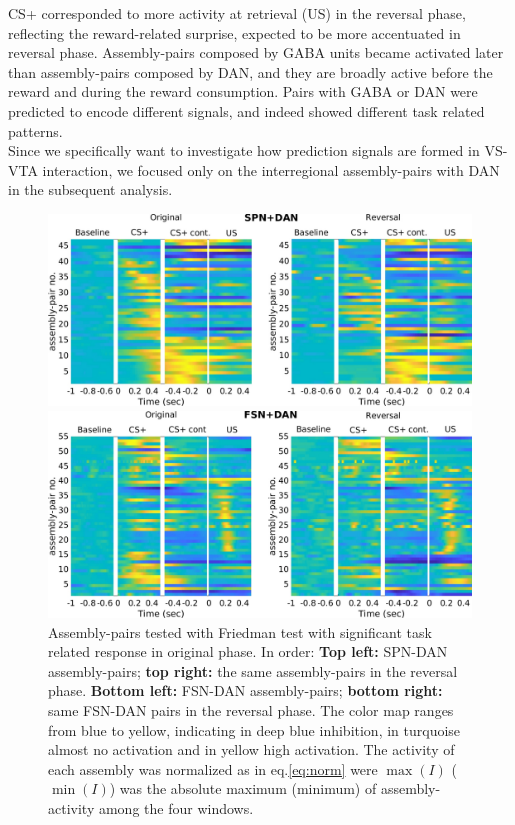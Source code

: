 CS+ corresponded to more activity at retrieval (US) in the reversal phase, reflecting the reward-related surprise, expected to be more accentuated in reversal phase. Assembly-pairs composed by GABA units became activated later than assembly-pairs composed by DAN, and they are broadly active before the reward and during the reward consumption. Pairs with GABA or DAN were predicted to encode different signals, and indeed showed different task related patterns.\\Since we specifically want to investigate how prediction signals are formed in VS-VTA interaction, we focused only on the interregional assembly-pairs with DAN in the subsequent analysis.\\
 \begin{figure}
     \centering
     \includegraphics[scale=0.32]{figures/SPN_DAN.pdf}
     
     \vspace{1cm}
     
     \includegraphics[scale=0.32]{figures/HeatFSN_DAN.pdf}
     \caption{Assembly-pairs tested with Friedman test with significant task related response in original phase. In order: \textbf{Top left:} SPN-DAN assembly-pairs; \textbf{top right:} the same assembly-pairs in the reversal phase. \textbf{Bottom left:} FSN-DAN assembly-pairs; \textbf{bottom right:} same FSN-DAN pairs in the reversal phase. The color map ranges from blue to yellow, indicating in deep blue inhibition, in turquoise almost no activation and in yellow high activation. The activity of each assembly was normalized as in eq.\ref{eq:norm} were $\max(I)$ ($\min(I)$) was the absolute maximum (minimum) of assembly-activity among the four windows.}
     \label{fig:HeatPairsDan}
 \end{figure}
